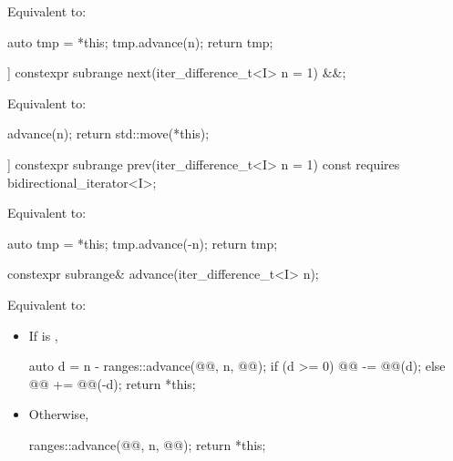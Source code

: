 \begin{itemdescr}
\pnum
\effects
Equivalent to:
\begin{codeblock}
auto tmp = *this;
tmp.advance(n);
return tmp;
\end{codeblock}
\end{itemdescr}

%
\begin{itemdecl}
[[nodiscard]] constexpr subrange next(iter_difference_t<I> n = 1) &&;
\end{itemdecl}

\begin{itemdescr}
\pnum
\effects
Equivalent to:
\begin{codeblock}
advance(n);
return std::move(*this);
\end{codeblock}
\end{itemdescr}

%
\begin{itemdecl}
[[nodiscard]] constexpr subrange prev(iter_difference_t<I> n = 1) const
  requires bidirectional_iterator<I>;
\end{itemdecl}

\begin{itemdescr}
\pnum
\effects
Equivalent to:
\begin{codeblock}
auto tmp = *this;
tmp.advance(-n);
return tmp;
\end{codeblock}
\end{itemdescr}

%
\begin{itemdecl}
constexpr subrange& advance(iter_difference_t<I> n);
\end{itemdecl}

\begin{itemdescr}
\pnum
\effects
Equivalent to:
\begin{itemize}
\item If  is ,
\begin{codeblock}
auto d = n - ranges::advance(@@, n, @@);
if (d >= 0)
  @@ -= @@(d);
else
  @@ += @@(-d);
return *this;
\end{codeblock}
\item Otherwise,
\begin{codeblock}
ranges::advance(@@, n, @@);
return *this;
\end{codeblock}
\end{itemize}
\end{itemdescr}

